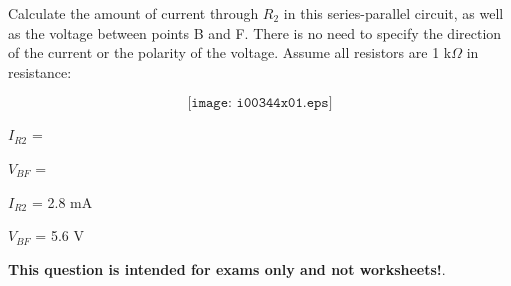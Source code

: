

Calculate the amount of current through $R_2$ in this series-parallel circuit, as well as the voltage between points B and F.  There is no need to specify the direction of the current or the polarity of the voltage.  Assume all resistors are 1 k$\Omega$ in resistance:

$$\texttt{[image: i00344x01.eps]}$$

$I_{R2}$ = 

\vskip 10pt

$V_{BF}$ = 

\vskip 10pt







$I_{R2}$ = 2.8 mA

\vskip 10pt

$V_{BF}$ = 5.6 V







{\bf This question is intended for exams only and not worksheets!}.



